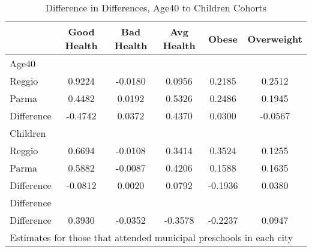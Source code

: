 \begin{table}[htbp]\centering
\caption{Difference in Differences, Age40 to Children Cohorts}
\begin{tabular}{l*{5}{c}}
\hline\hline
            & Good Health&  Bad Health&  Avg Health&       Obese&  Overweight\\
\hline
Age40       &            &            &            &            &            \\
Reggio      &      0.9224&     -0.0180&      0.0956&      0.2185&      0.2512\\
Parma       &      0.4482&      0.0192&      0.5326&      0.2486&      0.1945\\
Difference  &     -0.4742&      0.0372&      0.4370&      0.0300&     -0.0567\\
\hline
Children    &            &            &            &            &            \\
Reggio      &      0.6694&     -0.0108&      0.3414&      0.3524&      0.1255\\
Parma       &      0.5882&     -0.0087&      0.4206&      0.1588&      0.1635\\
Difference  &     -0.0812&      0.0020&      0.0792&     -0.1936&      0.0380\\
\hline
Difference  &            &            &            &            &            \\
Difference  &      0.3930&     -0.0352&     -0.3578&     -0.2237&      0.0947\\
\hline\hline
\multicolumn{6}{l}{\footnotesize Estimates for those that attended municipal preschools in each city}\\
\end{tabular}
\end{table}
